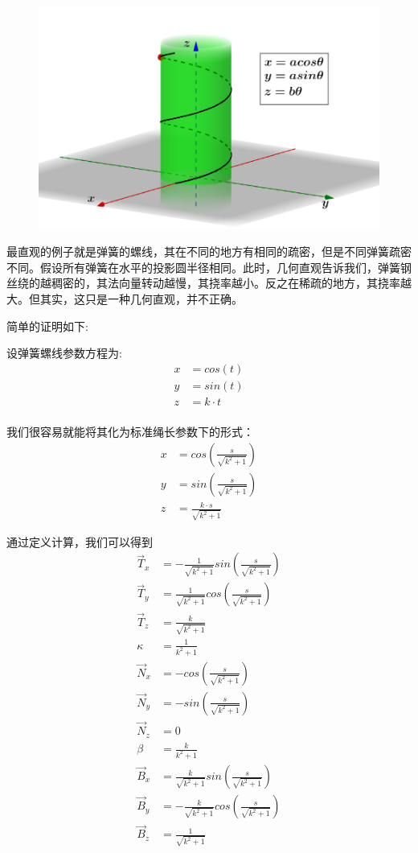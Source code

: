 \documentclass[fontset=windows]{article}
\begin{document}
\begin{figure}[htb]
	\centering
	\includegraphics[scale=0.5]{3.png}
	\caption{}
\end{figure}

最直观的例子就是弹簧的螺线，其在不同的地方有相同的疏密，但是不同弹簧疏密不同。假设所有弹簧在水平的投影圆半径相同。此时，几何直观告诉我们，弹簧钢丝绕的越稠密的，其法向量转动越慢，其挠率越小。反之在稀疏的地方，其挠率越大。但其实，这只是一种几何直观，并不正确。

简单的证明如下:

设弹簧螺线参数方程为:
$$
\begin{aligned}
    x &= cos(t)      \\
    y &= sin(t)      \\
    z &= k \cdot t   \\
\end{aligned}
$$

我们很容易就能将其化为标准绳长参数下的形式：
$$
\begin{aligned}
    x &= cos(\frac{s}{\sqrt{k^2 + 1}})  \\ 
    y &= sin(\frac{s}{\sqrt{k^2 + 1}})  \\
    z &= \frac{k \cdot s}{\sqrt{k^2+1}}
\end{aligned}
$$

通过定义计算，我们可以得到
$$
\begin{aligned}
    \vec{T}_x &= -\frac1{\sqrt{k^2 + 1}} sin(\frac{s}{\sqrt{k^2 + 1}}) \\
    \vec{T}_y &=  \frac1{\sqrt{k^2 + 1}} cos(\frac{s}{\sqrt{k^2 + 1}}) \\
    \vec{T}_z &= \frac{k}{\sqrt{k^2 + 1}} \\
    \kappa    &= \frac{1}{k^2 + 1} \\
    \vec{N}_x &= -cos(\frac{s}{\sqrt{k^2 + 1}}) \\
    \vec{N}_y &= -sin(\frac{s}{\sqrt{k^2 + 1}}) \\
    \vec{N}_z &= 0 \\
    \beta     &= \frac{k}{k^2 + 1}  \\
    \vec{B}_x &=  \frac{k}{\sqrt{k^2 + 1}} sin(\frac{s}{\sqrt{k^2 + 1}}) \\
    \vec{B}_y &= -\frac{k}{\sqrt{k^2 + 1}} cos(\frac{s}{\sqrt{k^2 + 1}}) \\
    \vec{B}_z &= \frac{1}{\sqrt{k^2 + 1}}
\end{aligned}
$$
\end{document}
